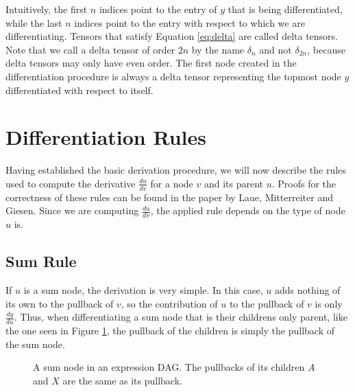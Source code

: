 \documentclass[12pt, a4paper]{report}
\begin{document}
Intuitively, the first $n$ indices point to the entry of $y$ that is being differentiated, while the last $n$ indices point to the entry with respect to which we are differentiating.
Tensors that satisfy Equation \ref{eq:delta} are called delta tensors.
Note that we call a delta tensor of order $2n$ by the name $\delta_n$ and not $\delta_{2n}$, because delta tensors may only have even order.
The first node created in the differentiation procedure is always a delta tensor representing the topmost node $y$ differentiated with respect to itself.

\section{Differentiation Rules}
Having established the basic derivation procedure, we will now describe the rules used to compute the derivative $\frac{du}{dv}$ for a node $v$ and its parent $u$.
Proofs for the correctness of these rules can be found in the paper by Laue, Mitterreiter and Giesen. \cite{tensorpaper}
Since we are computing $\frac{du}{dv}$, the applied rule depends on the type of node $u$ is.

\subsection{Sum Rule}
If $u$ is a sum node, the derivation is very simple.
In this case, $u$ adds nothing of its own to the pullback of $v$, so the contribution of $u$ to the pullback of $v$ is only $\frac{dy}{du}$.
Thus, when differentiating a sum node that is their childrens only parent, like the one seen in Figure \ref{fig:sum_rule}, the pullback of the children is simply the pullback of the sum node.

\begin{figure}
    \centering
    \caption{A sum node in an expression DAG. The pullbacks of its children $A$ and $X$ are the same as its pullback.}
    \label{fig:sum_rule}
\end{figure}
\end{document}

